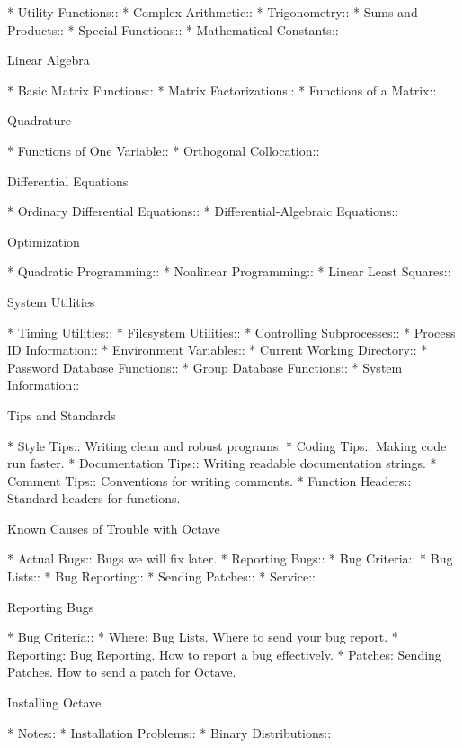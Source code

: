 * Utility Functions::           
* Complex Arithmetic::          
* Trigonometry::                
* Sums and Products::           
* Special Functions::           
* Mathematical Constants::      

Linear Algebra

* Basic Matrix Functions::      
* Matrix Factorizations::       
* Functions of a Matrix::       

Quadrature

* Functions of One Variable::   
* Orthogonal Collocation::      

Differential Equations

* Ordinary Differential Equations::  
* Differential-Algebraic Equations::  

Optimization

* Quadratic Programming::       
* Nonlinear Programming::       
* Linear Least Squares::        

System Utilities

* Timing Utilities::            
* Filesystem Utilities::        
* Controlling Subprocesses::    
* Process ID Information::      
* Environment Variables::       
* Current Working Directory::   
* Password Database Functions::  
* Group Database Functions::    
* System Information::          

Tips and Standards

* Style Tips::                  Writing clean and robust programs.
* Coding Tips::                 Making code run faster.
* Documentation Tips::          Writing readable documentation strings.
* Comment Tips::                Conventions for writing comments.
* Function Headers::            Standard headers for functions.

Known Causes of Trouble with Octave

* Actual Bugs::                 Bugs we will fix later.
* Reporting Bugs::              
* Bug Criteria::                
* Bug Lists::                   
* Bug Reporting::               
* Sending Patches::             
* Service::                     

Reporting Bugs

* Bug Criteria::                
* Where: Bug Lists.             Where to send your bug report.
* Reporting: Bug Reporting.     How to report a bug effectively.
* Patches: Sending Patches.     How to send a patch for Octave.

Installing Octave

* Notes::                       
* Installation Problems::       
* Binary Distributions::        

